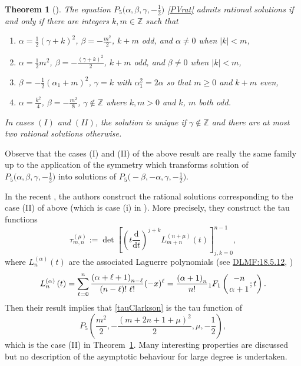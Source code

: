 \documentclass[10pt,a4paper]{amsart}
\numberwithin{equation}{section}
\newtheorem{Theorem}{Theorem}[section]
\theoremstyle{definition}
\def\le{\left}
\def\ri{\right}
\def \d{{\mathrm d}}
\def\be{\begin{equation}}
\def\ee{\end{equation}}
\def\Z{{\mathbb Z}}
\begin{document}
\begin{Theorem}[{\cite[Theorems~1.1 and~1.2]{Kitaev94}}]
\label{thmKitaev}
The equation $P_5\bigl(\alpha,\beta,\gamma,-\frac 1 2\bigr)$ \eqref{PVrat} admits rational solutions if and only if there are integers $k,m\in \Z$ such that
\begin{enumerate}[leftmargin=31pt]\itemsep=0pt
\item[$(I)$] $\alpha = \frac 1 2 (\gamma +k)^2$, $\beta = - \frac {m^2}2$, $k+m$ odd, and $\alpha\neq 0 $ when $|k|<m$,
\item[$(II)$] $\alpha = \frac 1 2 m^2$, $\beta = - \frac {(\gamma +k)^2}2$, $k+m$ odd, and $\beta\neq 0 $ when $|k|<m$,
\item [$(III)$] $\beta = -\frac 1 2(\alpha_1+m)^2$, $\gamma=k$ with $\alpha_1^2=2\alpha$ so that $m\geq 0 $ and $k+m$ even,
\item [$(IV)$] $\alpha =\frac {k^2}4$, $\beta = -\frac {m^2}8$, $\gamma \not\in \mathbb Z$ where $k,m>0$ and $k$, $m$ both odd.
\end{enumerate}
In cases $(I)$ and $(II)$, the solution is unique if $\gamma \not\in\Z$ and there are at most two rational solutions otherwise.
\end{Theorem}
Observe that the cases (I) and (II) of the above result are really the same family up to the application of the symmetry  which transforms solution of $P_5\bigl(\alpha, \beta, \gamma, -\frac 1 2\bigr)$ into solutions of $P_5\bigl(-\beta, -\alpha, \gamma, -\frac 1 2\bigr)$.

In the recent \cite{ClarksonDunning}, the authors construct the rational solutions corresponding to the case (II) of \cite{Kitaev94} above (which is case (i) in \cite[Theorem~4.1]{ClarksonDunning}).
More precisely, they construct the tau functions
\be
\label{tauClarkson}
\tau^{(\mu)}_{m,n} := \det \le[\le(t \frac \d{\d t}\ri)^{j+k} L^{(n+\mu)}_{m+n} (t)\ri]_{j,k=0}^{n-1},
\ee
where $L^{( \alpha)}_n(t)$ are the associated Laguerre polynomials (see \href{https://dlmf.nist.gov/18.5.E12}{DLMF:18.5.12}, \cite{DLMF})
\[
L^{(\alpha)}_{n}\left(t\right)=\sum_{\ell=0}^{n}\frac{{\left(\alpha+\ell+1%
\right)_{n-\ell}}}{(n-\ell)!\;\ell!}(-x)^{\ell}=\frac{{\left(\alpha+1\right)_{%
n}}}{n!}{{}_{1}F_{1}}\left({-n\atop\alpha+1};t\right).
\]
Then their result implies that \eqref{tauClarkson} is the tau function of
\[
P_5\le( \frac {m^2}2,- \frac{(m+2n+1+\mu)^2} 2, \mu, -\frac 1 2\ri),
\]
 which is the case (II) in Theorem~\ref{thmKitaev}.
Many interesting properties are discussed but no description of the asymptotic behaviour for large degree is undertaken.
\end{document}
